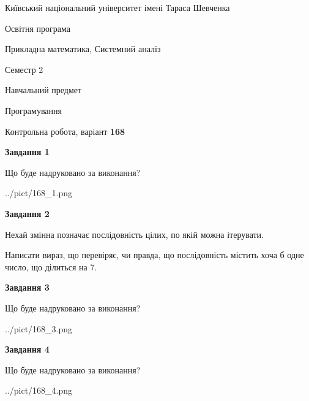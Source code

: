 \documentclass[12pt, ukrainian]{article}
\begin{document}
{{\begin {small}\par
{ \center  Київський національний університет імені Тараса Шевченка \par}
{\parbox {5 cm}{Освітня програма \hfill}{\parbox {8 cm}{Прикладна математика, Системний аналіз \hfill}}\parbox {5 cm}{\hfill Семестр 2}}\par
{\parbox {5 cm} {Навчальний предмет \hfill}\parbox {7 cm}{Програмування \hfill}\parbox {6cm}{\hfill}\par}\vspace{-7pt} \end{small}}{\center Контрольна робота, варіант  \No \textbf
{ 168 }\par}}
{
\begin {large}
{\begin {center}\textbf{Завдання 1}\end {center}}\par
Що буде надруковано за виконання?\par\par
\begin{center}
	{../pict/168_1.png}
\end{center}
\newpage

{\begin {center}\textbf{Завдання 2}\end {center}}\par
Нехай змінна  позначає послідовність цілих, по якій можна ітерувати.

Написати вираз, що перевіряє, чи правда, що послідовність  містить хоча б одне число, що ділиться на 7.\par
\newpage

{\begin {center}\textbf{Завдання 3}\end {center}}\par
Що буде надруковано за виконання?\par
\begin{center}
	{../pict/168_3.png}
\end{center}
\newpage

{\begin {center}\textbf{Завдання 4}\end {center}}\par
Що буде надруковано за виконання?\par
\begin{center}
	{../pict/168_4.png}
\end{center}
\newpage


\end{large}}
\end{document}
